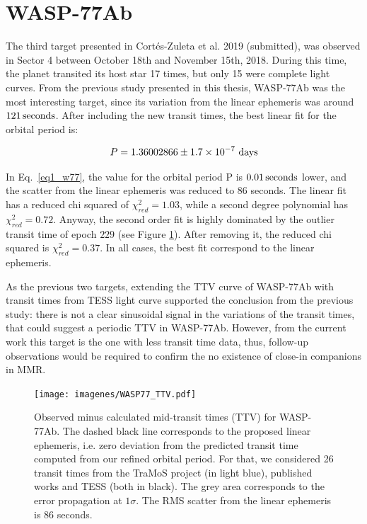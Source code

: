 \section{WASP-77Ab}

The third target presented in Cortés-Zuleta et al. 2019 (submitted), was observed in Sector 4 between October 18th and November 15th, 2018.  During this time, the planet transited its host star 17 times, but only 15 were complete light curves. From the previous study presented in this thesis, WASP-77Ab was the most interesting target, since its variation from the linear ephemeris was around  $121\,\rm seconds$.  After including the new transit times, the best linear fit for the orbital period is:

\begin{equation}
P = 1.36002866 \pm 1.7\times10^{-7} ~\rm days
\end{equation}

In Eq.~\ref{eq1_w77}, the value for the orbital period P is $0.01\,\rm seconds$ lower, and the scatter from the linear ephemeris was reduced to 86 seconds. The linear fit has a reduced chi squared of $\chi^2_{red}=1.03$, while a second degree polynomial has $\chi^2_{red}=0.72$. Anyway, the second order fit is highly dominated by the outlier transit time of epoch $229$ (see Figure \ref{wasp77_ttv}). After removing it, the reduced chi squared is  $\chi^2_{red}=0.37$. In all cases, the best fit correspond to the linear ephemeris.

As the previous two targets, extending the TTV curve of WASP-77Ab with transit times from TESS light curve supported the conclusion from the previous study: there is not a clear sinusoidal signal in the variations of the transit times, that could suggest a periodic TTV in WASP-77Ab. However, from the current work this target is the one with less transit time data, thus, follow-up observations would be required to confirm the no existence of close-in companions in MMR.


\begin{figure}[ht]
\texttt{[image: imagenes/WASP77\_TTV.pdf]}
\caption{Observed minus calculated mid-transit times (TTV) for WASP-77Ab. The dashed black line corresponds to the proposed linear ephemeris, i.e. zero deviation from the predicted transit time  computed from our refined orbital period. For that, we considered 26 transit times from the TraMoS project (in light blue), published works and TESS (both in black). The grey area corresponds to the error propagation at $1\sigma$. The RMS scatter from the linear ephemeris is 86 seconds.}
\label{wasp77_ttv}
\end{figure}



